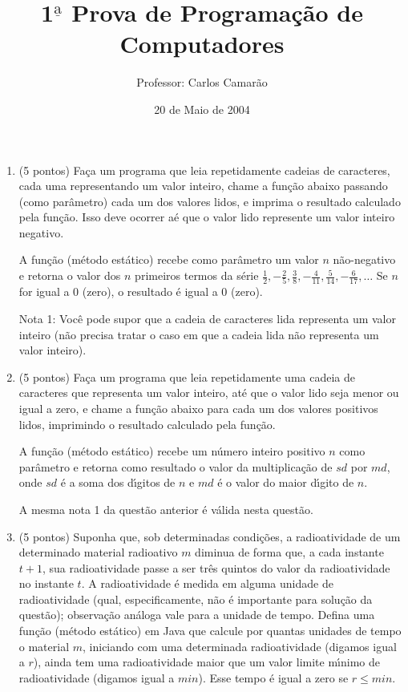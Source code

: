 \documentclass[brazil]{article}
\title{1$^{\underline{\mbox{a}}}$ Prova de Programa\c{c}\~ao de Computadores}
\author{Professor: Carlos Camar\~ao}
\date{20 de Maio de 2004}
\begin{document}
\maketitle

\begin{enumerate}

\item (5 pontos) Fa\c{c}a um programa que leia repetidamente 
cadeias de caracteres, cada uma representando um valor inteiro, chame
a fun\c{c}\~ao abaixo passando (como par\^ametro) cada um dos valores
lidos, e imprima o resultado calculado pela fun\c{c}\~ao. Isso deve
ocorrer a\'e que o valor lido represente um valor inteiro negativo.

A fun\c{c}\~ao (m\'etodo est\'atico) recebe como par\^ametro um valor
$n$ n\~ao-negativo e retorna o valor dos $n$ primeiros termos da
s\'erie $\frac{1}{2}, -\frac{2}{5}, \frac{3}{8}, -\frac{4}{11},
\frac{5}{14}, -\frac{6}{17}, \ldots$ Se $n$ for igual a 0 (zero), o
resultado \'e igual a 0 (zero).

Nota 1: Voc\^e pode supor que a cadeia de caracteres lida representa
um valor inteiro (n\~ao precisa tratar o caso em que a cadeia lida
n\~ao representa um valor inteiro).

\item (5 pontos) Fa\c{c}a um programa que leia repetidamente uma
cadeia de caracteres que representa um valor inteiro, at\'e que o
valor lido seja menor ou igual a zero, e chame a fun\c{c}\~ao abaixo
para cada um dos valores positivos lidos, imprimindo o resultado
calculado pela fun\c{c}\~ao.

A fun\c{c}\~ao (m\'etodo est\'atico) recebe um n\'umero inteiro
posi\-tivo $n$ como par\^ametro e retorna como resultado o valor da
multiplica\c{c}\~ao de $sd$ por $md$, onde $sd$ \'e a soma dos
d\'{\i}gitos de $n$ e $md$ \'e o valor do maior d\'{\i}gito de $n$.

A mesma nota 1 da quest\~ao anterior \'e v\'alida nesta quest\~ao.

\item (5 pontos) Suponha que, sob determinadas condi\c{c}\~oes, a
radioatividade de um determinado material radioativo $m$ diminua de
forma que, a cada instante $t+1$, sua radioatividade passe a ser
tr\^es quintos do valor da radioatividade no instante $t$. A
radioatividade \'e medida em alguma unidade de radioatividade (qual,
especificamente, n\~ao \'e importante para solu\c{c}\~ao da
quest\~ao); observa\c{c}\~ao an\'aloga vale para a unidade de
tempo. Defina uma fun\c{c}\~ao (m\'etodo est\'atico) em Java que
calcule por quantas unidades de tempo o material $m$, iniciando com
uma determinada radioatividade (digamos igual a $r$), ainda tem uma
radioatividade maior que um valor limite m\'{\i}nimo de radioatividade
(digamos igual a $\mathit{min}$). Esse tempo \'e igual a zero se $r
\leq \mathit{min}$.


\end{enumerate}
\end{document}
